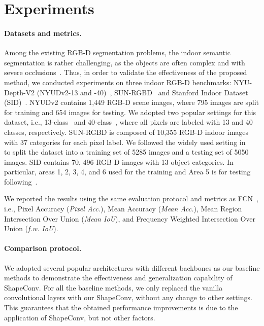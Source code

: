 \vspace{-0.3cm}
\section{Experiments}
\vspace{-0.2cm}
\paragraph{Datasets and metrics.}
Among the existing RGB-D segmentation problems, the indoor semantic segmentation is rather challenging, as the objects are often complex and with severe occlusions~\cite{chen2021spatial}. Thus, in order to validate the effectiveness of the proposed method, we conducted experiments on three indoor RGB-D benchmarks: NYU-Depth-V2 (NYUDv2-13 and -40)~\cite{silberman2012indoor}, SUN-RGBD~\cite{song2015sun} and Stanford Indoor Dataset (SID)~\cite{armeni2017joint}. NYUDv2 contains 1,449 RGB-D scene images, where 795 images are split for training and 654 images for testing. We adopted two popular settings for this dataset, i.e., 13-class~\cite{silberman2012indoor} and 40-class~\cite{gupta2013perceptual}, where all pixels are labeled with 13 and 40 classes, respectively. SUN-RGBD is composed of 10,355 RGB-D indoor images with 37 categories for each pixel label. We followed the widely used setting in ~\cite{song2015sun} to split the dataset into a training set of 5285 images and a testing set of 5050 images. SID contains 70, 496 RGB-D images with 13 object categories. In particular, areas 1, 2, 3, 4, and 6 used for the training and Area 5 is for testing following~\cite{wang2018depth}. 


We reported the results using the same evaluation protocol and metrics as FCN~\cite{long2015fully}, i.e., Pixel Accuracy (\emph{Pixel Acc.}), Mean Accuracy (\emph{Mean Acc.}), Mean Region Intersection Over Union (\emph{Mean IoU}), and Frequency Weighted Intersection Over Union (\emph{f.w. IoU}).

\vspace{-0.6cm}
\paragraph{Comparison protocol.} We adopted several popular architectures with different backbones as our baseline methods to demonstrate the effectiveness and generalization capability of ShapeConv. For all the baseline methods, we only replaced the vanilla convolutional layers with our ShapeConv, without any change to other settings. This guarantees that the obtained performance improvements is due to the application of ShapeConv, but not other factors. 

